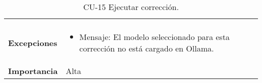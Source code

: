 \begin{table}[p]
\begin{tabularx}{\linewidth}{ p{} p{} }
\begin{itemize}
		                                 \end{itemize} \\
		\textbf{Excepciones}         & \begin{itemize}
                                        \tightlist
		                                  \item Mensaje: El modelo seleccionado para esta corrección no está cargado en Ollama.
		                                 \end{itemize} \\
		\textbf{Importancia}          & Alta \\
		\bottomrule
	\end{tabularx}
	\caption{CU-15 Ejecutar corrección.}
	\label{tab:CU-15}
\end{table}

